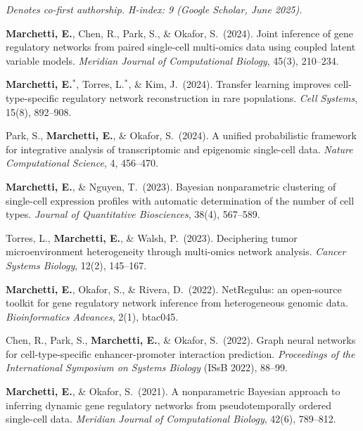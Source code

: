 \documentclass[11pt,a4paper]{article}
\begin{document}
{\small
\textit{Denotes co-first authorship. H-index: 9 (Google Scholar, June 2025).}

\begin{enumerate}[leftmargin=2.5em,label={[\arabic*]},itemsep=5pt,topsep=6pt]
  \item \textbf{Marchetti, E.}, Chen, R., Park, S., \& Okafor, S.\ (2024). Joint inference of gene regulatory networks from paired single-cell multi-omics data using coupled latent variable models. \textit{Meridian Journal of Computational Biology}, 45(3), 210--234.

  \item \textbf{Marchetti, E.}$^\ast$, Torres, L.$^\ast$, \& Kim, J.\ (2024). Transfer learning improves cell-type-specific regulatory network reconstruction in rare populations. \textit{Cell Systems}, 15(8), 892--908.

  \item Park, S., \textbf{Marchetti, E.}, \& Okafor, S.\ (2024). A unified probabilistic framework for integrative analysis of transcriptomic and epigenomic single-cell data. \textit{Nature Computational Science}, 4, 456--470.

  \item \textbf{Marchetti, E.}, \& Nguyen, T.\ (2023). Bayesian nonparametric clustering of single-cell expression profiles with automatic determination of the number of cell types. \textit{Journal of Quantitative Biosciences}, 38(4), 567--589.

  \item Torres, L., \textbf{Marchetti, E.}, \& Walsh, P.\ (2023). Deciphering tumor microenvironment heterogeneity through multi-omics network analysis. \textit{Cancer Systems Biology}, 12(2), 145--167.

  \item \textbf{Marchetti, E.}, Okafor, S., \& Rivera, D.\ (2022). NetRegulus: an open-source toolkit for gene regulatory network inference from heterogeneous genomic data. \textit{Bioinformatics Advances}, 2(1), btac045.

  \item Chen, R., Park, S., \textbf{Marchetti, E.}, \& Okafor, S.\ (2022). Graph neural networks for cell-type-specific enhancer-promoter interaction prediction. \textit{Proceedings of the International Symposium on Systems Biology} (IS\lowercase{s}B 2022), 88--99.

  \item \textbf{Marchetti, E.}, \& Okafor, S.\ (2021). A nonparametric Bayesian approach to inferring dynamic gene regulatory networks from pseudotemporally ordered single-cell data. \textit{Meridian Journal of Computational Biology}, 42(6), 789--812.


\end{enumerate}}
\end{document}
